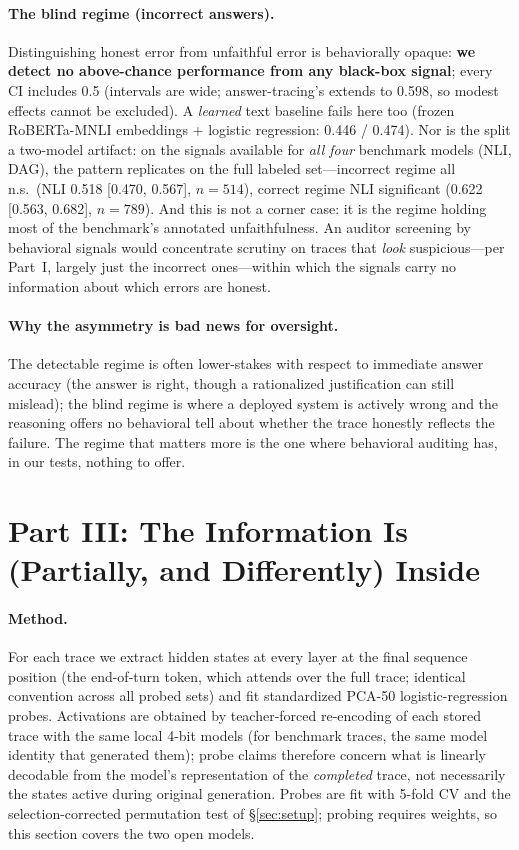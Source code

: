 \documentclass[11pt]{article}
\begin{document}
\paragraph{The blind regime (incorrect answers).} Distinguishing honest error from unfaithful error is behaviorally opaque: \textbf{we detect no above-chance performance from any black-box signal}; every CI includes 0.5 (intervals are wide; answer-tracing's extends to 0.598, so modest effects cannot be excluded). A \emph{learned} text baseline fails here too (frozen RoBERTa-MNLI embeddings + logistic regression: 0.446 / 0.474). Nor is the split a two-model artifact: on the signals available for \emph{all four} benchmark models (NLI, DAG), the pattern replicates on the full labeled set---incorrect regime all n.s.\ (NLI 0.518 [0.470, 0.567], $n{=}514$), correct regime NLI significant (0.622 [0.563, 0.682], $n{=}789$). And this is not a corner case: it is the regime holding most of the benchmark's annotated unfaithfulness. An auditor screening by behavioral signals would concentrate scrutiny on traces that \emph{look} suspicious---per Part~I, largely just the incorrect ones---within which the signals carry no information about which errors are honest.

\paragraph{Why the asymmetry is bad news for oversight.} The detectable regime is often lower-stakes with respect to immediate answer accuracy (the answer is right, though a rationalized justification can still mislead); the blind regime is where a deployed system is actively wrong and the reasoning offers no behavioral tell about whether the trace honestly reflects the failure. The regime that matters more is the one where behavioral auditing has, in our tests, nothing to offer.

\section{Part III: The Information Is (Partially, and Differently) Inside}
\label{sec:internals}

\paragraph{Method.} For each trace we extract hidden states at every layer at the final sequence position (the end-of-turn token, which attends over the full trace; identical convention across all probed sets) and fit standardized PCA-50 logistic-regression probes. Activations are obtained by teacher-forced re-encoding of each stored trace with the same local 4-bit models (for benchmark traces, the same model identity that generated them); probe claims therefore concern what is linearly decodable from the model's representation of the \emph{completed} trace, not necessarily the states active during original generation. Probes are fit with 5-fold CV and the selection-corrected permutation test of \S\ref{sec:setup}; probing requires weights, so this section covers the two open models.
\end{document}
